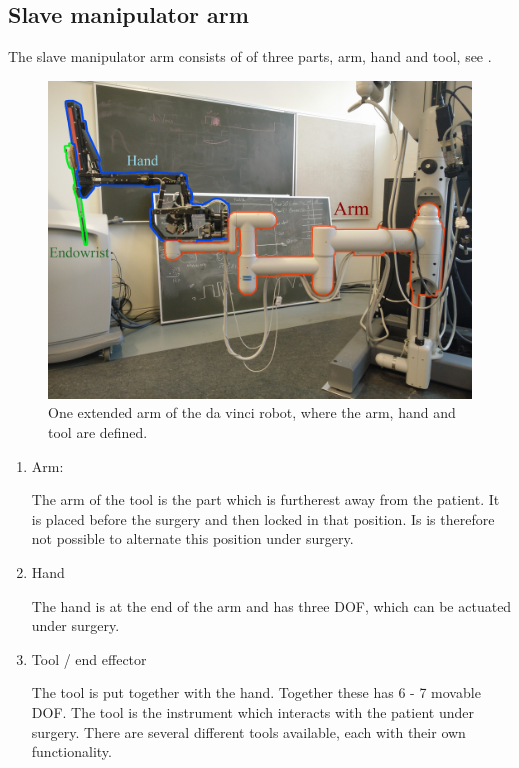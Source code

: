 \subsection*{Slave manipulator arm}
The slave manipulator arm consists of of three parts, arm, hand and tool, see .

\begin{figure}[H]
	\centering
		\centering
		\includegraphics[width=0.85\linewidth]{davincirobotarm_label.jpg}
		\caption{One extended arm of the da vinci robot, where the arm, hand and tool are defined.}
		\label{fig:davinciarmrobot}
\end{figure}


\begin{enumerate}
\item Arm:

The arm of the tool is the part which is furtherest away from the patient. It is placed before the surgery and then locked in that position. Is is therefore not possible to alternate this position under surgery.
\item Hand

The hand is at the end of the arm and has three \gls{DOF}, which can be actuated under surgery.
\item Tool / end effector 

The tool is put together with the hand. Together these has 6 - 7 movable \gls{DOF}. The tool is the instrument which interacts with the patient under surgery. There are several different tools available, each with their own functionality. 
\end{enumerate}

